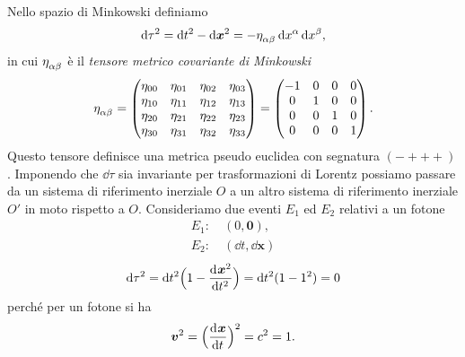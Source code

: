 Nello spazio di Minkowski definiamo
\begin{equation}
  \dd \tau^{2} = \dd t^{2} - \dd \bm{x}^{2} = -\tensor{\eta}{_{\alpha\beta}}\dd
  x^{\alpha} \dd x^{\beta},
\end{equation}
in cui $\tensor{\eta}{_{\alpha\beta}}$ è il
\emph{tensore metrico covariante di Minkowski}
\begin{equation}
  \label{eq:tensore-metrico-controvariante}
  \tensor{\eta}{_{\alpha\beta}} =
  \begin{pmatrix}
   \eta_{00} & \eta_{01} & \eta_{02} & \eta_{03} \\
   \eta_{10} & \eta_{11} & \eta_{12} & \eta_{13} \\
   \eta_{20} & \eta_{21} & \eta_{22} & \eta_{23} \\
   \eta_{30} & \eta_{31} & \eta_{32} & \eta_{33}
  \end{pmatrix}
  =
  \begin{pmatrix}
    -1 & 0 & 0 & 0 \\
    0 & 1 & 0 & 0 \\
    0 & 0 & 1 & 0 \\
    0 & 0 & 0 & 1
  \end{pmatrix}.
\end{equation}
Questo tensore definisce una metrica pseudo euclidea con segnatura $(-+++)$.
Imponendo che $\dd \tau$ sia invariante per trasformazioni di Lorentz possiamo
passare da un sistema di riferimento inerziale $O$ a un altro sistema di
riferimento inerziale $O'$ in moto rispetto a $O$.  Consideriamo due eventi
$E_{1}$ ed $E_{2}$ relativi a un fotone
\begin{gather}
  E_{1}: \quad (0,\bm{0}), \\
  E_{2}: \quad (\dd t, \dd \bm{x})
\end{gather}
\begin{equation}
  \mathop{}\!\mathrm{d} \tau^{2} = \mathop{}\!\mathrm{d} t^{2}\Big( 1 - \frac{{\mathop{}\!\mathrm{d}^{}}\bm{x}^{2}}{\mathop{}\!\mathrm{d} {t^{2}}^{}}\Big) = \mathop{}\!\mathrm{d} t^{2}
  (1 - 1^{2}) = 0
\end{equation}
perché per un fotone si ha
\begin{equation}
  \bm{v}^{2} = \Big(\frac{{\mathop{}\!\mathrm{d}^{}}\bm{x}}{\mathop{}\!\mathrm{d} {t}^{}}\Big)^{2} = c^{2} = 1.
\end{equation}


